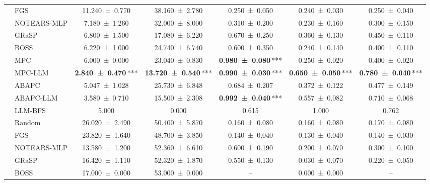 \begin{table}[t]
{\begin{tabular}{llccccc}
     & FGS & \num{11.240 +- 0.770} & \num{38.160 +- 2.780} & \num{0.250 +- 0.050} & \num{0.240 +- 0.030} & \num{0.250 +- 0.040} \\
     & NOTEARS-MLP & \num{7.180 +- 1.260} & \num{32.000 +- 8.000} & \num{0.310 +- 0.200} & \num{0.230 +- 0.160} & \num{0.300 +- 0.150} \\
     & GRaSP & \num{6.800 +- 1.500} & \num{17.080 +- 6.220} & \num{0.670 +- 0.250} & \num{0.360 +- 0.130} & \num{0.450 +- 0.110} \\
     & BOSS & \num{6.220 +- 1.000} & \num{24.740 +- 6.740} & \num{0.600 +- 0.350} & \num{0.240 +- 0.140} & \num{0.400 +- 0.110} \\
     & MPC & \num{6.000 +- 0.000} & \num{23.040 +- 0.830} & {\bfseries \num{0.980 +- 0.080}}\,\textnormal{***} & \num{0.250 +- 0.020} & \num{0.400 +- 0.020} \\
     & MPC-LLM & {\bfseries \num{2.840 +- 0.470}}\,\textnormal{***} & {\bfseries \num{13.720 +- 0.540}}\,\textnormal{***} & {\bfseries \num{0.990 +- 0.030}}\,\textnormal{***} & {\bfseries \num{0.650 +- 0.050}}\,\textnormal{***} & {\bfseries \num{0.780 +- 0.040}}\,\textnormal{***} \\
     & ABAPC & \num{5.047 +- 1.028} & \num{25.730 +- 6.848} & \num{0.684 +- 0.207} & \num{0.372 +- 0.122} & \num{0.477 +- 0.149} \\
     & ABAPC-LLM & \num{3.580 +- 0.710} & \num{15.500 +- 2.308} & {\bfseries \num{0.992 +- 0.040}}\,\textnormal{***} & \num{0.557 +- 0.082} & \num{0.710 +- 0.068} \\
     & LLM-BFS & \num{5.000} & \num{0.000} & \num{0.615} & \num{1.000} & \num{0.762} \\
    \midrule
     & Random & \num{26.020 +- 2.490} & \num{50.400 +- 5.870} & \num{0.160 +- 0.080} & \num{0.160 +- 0.080} & \num{0.170 +- 0.080} \\
     & FGS & \num{23.820 +- 1.640} & \num{48.700 +- 3.850} & \num{0.140 +- 0.040} & \num{0.130 +- 0.040} & \num{0.140 +- 0.030} \\
     & NOTEARS-MLP & \num{13.580 +- 1.200} & \num{52.360 +- 6.610} & \num{0.600 +- 0.190} & \num{0.200 +- 0.070} & \num{0.300 +- 0.100} \\
     & GRaSP & \num{16.420 +- 1.110} & \num{52.320 +- 1.870} & \num{0.550 +- 0.130} & \num{0.030 +- 0.070} & \num{0.220 +- 0.050} \\
     & BOSS & \num{17.000 +- 0.000} & \num{53.000 +- 0.000} & -- & \num{0.000 +- 0.000} & -- \\

\end{tabular}}
\end{table}
